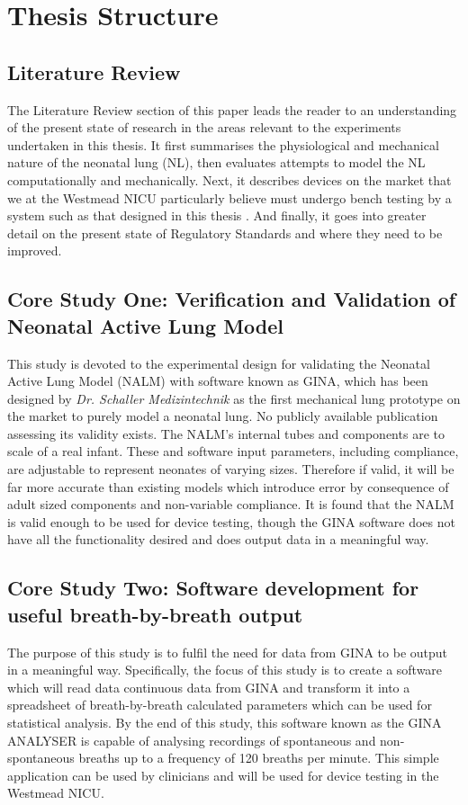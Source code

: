 \documentclass[12pt, openany, oneside]{book}
\begin{document}
\section{Thesis Structure}


\subsection{Literature Review}
The Literature Review section of this paper leads the reader to an understanding of the present state of research in the areas relevant to the experiments undertaken in this thesis. It first summarises the physiological and mechanical nature of the neonatal lung (NL), then evaluates attempts to model the NL computationally and mechanically. Next, it describes devices on the market that we at the Westmead NICU particularly believe must undergo bench testing by a system such as that designed in this thesis . And finally, it goes into greater detail on the present state of Regulatory Standards and where they need to be improved.

\subsection{Core Study One: Verification and Validation of Neonatal Active Lung Model}
This study is devoted to the experimental design for validating the Neonatal Active Lung Model (NALM) with software known as GINA, which has been designed by \textit{Dr. Schaller Medizintechnik} \texttrademark  as the first mechanical lung prototype on the market to purely model a neonatal lung. No publicly available publication assessing its validity exists. The NALM's internal tubes and components are to scale of a real infant. These and software input parameters, including compliance, are adjustable to represent neonates of varying sizes. Therefore if valid, it will be far more accurate than existing models which introduce error by consequence of adult sized components and non-variable compliance. It is found that the NALM is valid enough to be used for device testing, though the GINA software does not have all the functionality desired and does output data in a meaningful way.


\subsection{Core Study Two: Software development for useful breath-by-breath output}
The purpose of this study is to fulfil the need for data from GINA to be output in a meaningful way. Specifically, the focus of this study is to create a software  which will read data continuous data from GINA and transform it into a spreadsheet of breath-by-breath calculated parameters which can be used for statistical analysis. By the end of this study, this software known as the GINA ANALYSER is capable of analysing recordings of spontaneous and non-spontaneous breaths up to a frequency of 120 breaths per minute. This simple application can be used by clinicians and will be used for device testing in the Westmead NICU.
\end{document}
